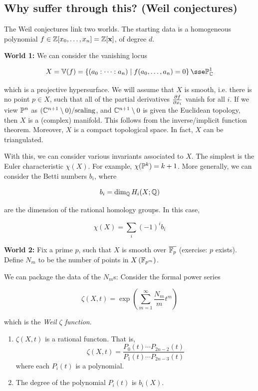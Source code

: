 \documentclass{article}
\begin{document}
\subsection*{Why suffer through this? (Weil conjectures)}

The Weil conjectures link two worlds. The starting data is a homogeneous polynomial \(f \in \mathbb{Z}[x_0, \dots, x_n] = \mathbb{Z}[\bf x]\), of degree \(d\).

\textbf{World 1:} We can consider the vanishing locus

\[X = \bb V(f) = \left\{(a_0: \dots : a_n) \mid f(a_0, \dots, a_n) = 0\right\} \sse \bb P^1_\C\]

which is a projective hypersurface. We will assume that \(X\) is smooth, i.e. there is no point \(p \in X\), such that all of the partial derivatives \(\pdv{f}{x_i}(p)\) vanish for all \(i\). If we view \(\mathbb{P}^n\) as \((\mathbb{C}^{n+1} \setminus 0)/\text{scaling}\), and \(\mathbb{C}^{n+1}\setminus 0\) is given the Euclidean topology, then \(X\) is a (complex) manifold. This follows from the inverse/implicit function theorem. Moreover, \(X\) is a compact topological space. In fact, \(X\) can be triangulated. 

With this, we can consider various invariants associated to \(X\). The simplest is the Euler characteristic \(\chi(X)\). For example, \(\chi(\mathbb{P}^k) = k+1\). More generally, we can consider the Betti numbers \(b_i\), where

\[b_i = \dim_{\mathbb{Q}} H_i(X; \mathbb{Q})\]

are the dimension of the rational homology groups. In this case,

\[\chi(X) = \sum_i(-1)^i b_i\]

\textbf{World 2:} Fix a prime \(p\), such that \(X\) is smooth over \(\overline{\mathbb{F}_p}\) (exercise: \(p\) exists). Define \(N_m\) to be the number of points in \(X\left(\mathbb{F}_{p^m}\right)\).

We can package the data of the \(N_m\)s: Consider the formal power series

\[\zeta(X, t) = \exp(\sum_{m=1}^\infty \frac{N_m}{m} t^m)\]

which is the \emph{Weil \(\zeta\) function}.

\begin{theorem}
    [Grothendieck]

    \leavevmode

    \begin{enumerate}
        \item \(\zeta(X, t)\) is a rational functon. That is, \[\zeta(X, t) = \frac{P_0(t)\cdots P_{2n-2}(t)}{P_1(t)\cdots P_{2n-3}(t)}\] where each \(P_i(t)\) is a polynomial.
        \item The degree of the polynomial \(P_i(t)\) is \(b_i(X)\).
    \end{enumerate}
\end{theorem}
\end{document}
